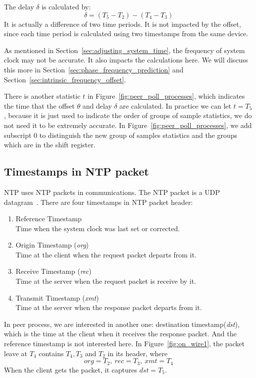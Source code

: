 The delay $\delta$ is calculated by:
\begin{equation}
    \delta = (T_5 - T_2) - (T_4 - T_3)
    \label{eq:delay_def}
\end{equation}
It is actually a difference of two time periods. It is not impacted by the
offset, since each time period is calculated using two timestamps from the same
device. 

As mentioned in Section~\ref{sec:adjusting_system_time}, the frequency of 
system clock may not be accurate. It also impacts the calculations here. We
will discuss this more in Section~\ref{sec:phase_frequency_prediction} and
Section~\ref{sec:intrinsic_frequency_offset}.

There is another statistic $t$ in Figure~\ref{fig:peer_poll_processes}, which
indicates the time that the offset $\theta$ and delay $\delta$ are calculated.
In practice we can let $t = T_5$, because it is just used to indicate the order
of groups of sample statistics, we do not need it to be extremely accurate.
In Figure~\ref{fig:peer_poll_processes}, we add subscript 0 to distinguish the
new group of samples statistics and the groups which are in the shift register.

\subsection{Timestamps in NTP packet}%
\label{sub:timestamps_in_ntp_packet}
NTP uses NTP packets in communications. The NTP packet is a UDP
datagram~\cite{rfc5905}. There are four timestamps in NTP packet header:
\begin{enumerate}
    \item Reference Timestamp\\
        Time when the system clock was last set or corrected.
    \item Origin Timestamp (\emph{org})\\
        Time at the client when the request packet departs from it.
    \item Receive Timestamp (\emph{rec})\\
        Time at the server when the request packet is receive by it.
    \item Transmit Timestamp (\emph{xmt})\\
        Time at the server when the response packet departs from it.
\end{enumerate}
In peer process, we are interested in another one: destination
timestamp(\emph{dst}), which is the time at the client when it receives the
response packet. And the reference timestamp is not interested here. In
Figure~\ref{fig:on_wire1}, the packet leave at $T_4$ contains $T_4, T_3$ and
$T_2$ in its header, where
$$ org = T_2,~rec = T_3,~xmt = T_4 $$
When the client gets the packet, it captures $dst = T_5$.

